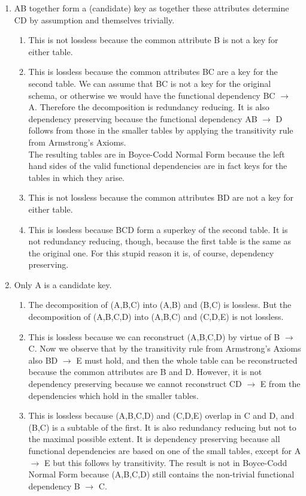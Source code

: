 \begin{enumerate}[label=\alph*.]
  \item AB together form a (candidate) key as together these attributes determine CD by assumption and themselves
  trivially.

  \begin{enumerate}[label=\roman*.]
    \item This is not lossless because the common attribute B is not a key for either table.
    \item This is lossless because the common attributes BC are a key for the second table. We can assume
    that BC is not a key for the original schema, or otherwise we would have the functional dependency
    BC $\rightarrow$ A. Therefore the decomposition is redundancy reducing. It is also dependency preserving
    because the functional dependency AB $\rightarrow$ D follows from those in the smaller tables by applying the
    transitivity rule from Armstrong’s Axioms.\\
    The resulting tables are in Boyce-Codd Normal Form because the left hand sides of the valid functional
    dependencies are in fact keys for the tables in which they arise.
    \item This is not lossless because the common attributes BD are not a key for either table.
    \item This is lossless because BCD form a superkey of the second table. It is not redundancy reducing,
    though, because the first table is the same as the original one. For this stupid reason it is, of course,
    dependency preserving.
  \end{enumerate}

  \item Only A is a candidate key.

  \begin{enumerate}[label=\roman*.]
    \item The decomposition of (A,B,C) into (A,B) and (B,C) is lossless. But the decomposition of
    (A,B,C,D) into (A,B,C) and (C,D,E) is not lossless.
    \item This is lossless because we can reconstruct (A,B,C,D) by virtue of B $\rightarrow$ C. Now we observe that
    by the transitivity rule from Armstrong’s Axioms also BD $\rightarrow$ E must hold, and then the whole table
    can be reconstructed because the common attributes are B and D. However, it is not dependency
    preserving because we cannot reconstruct CD $\rightarrow$ E from the dependencies which hold in the smaller
    tables.
    \item This is lossless because (A,B,C,D) and (C,D,E) overlap in C and D, and (B,C) is a subtable
    of the first. It is also redundancy reducing but not to the maximal possible extent. It is dependency
    preserving because all functional dependencies are based on one of the small tables, except for A $\rightarrow$ E
    but this follows by transitivity. The result is not in Boyce-Codd Normal Form because (A,B,C,D)
    still contains the non-trivial functional dependency B $\rightarrow$ C.
  \end{enumerate}
\end{enumerate}

